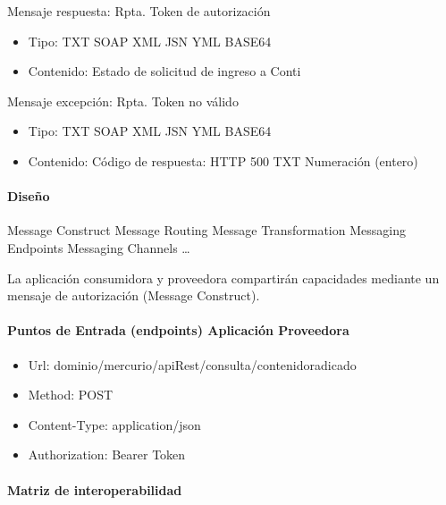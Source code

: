 \documentclass[
  paper=a4,
  ,captions=tableheading
]{scrartcl}
\providecommand{\tightlist}{%
  \setlength{\itemsep}{0pt}\setlength{\parskip}{0pt}}
\begin{document}
Mensaje respuesta: Rpta. Token de autorización

\begin{itemize}
\tightlist
\item
  Tipo: TXT \textbar{} SOAP \textbar{} XML \textbar{} JSN \textbar{} YML
  \textbar{} BASE64
\item
  Contenido: Estado de solicitud de ingreso a Conti
\end{itemize}

Mensaje excepción: Rpta. Token no válido

\begin{itemize}
\tightlist
\item
  Tipo: TXT \textbar{} SOAP \textbar{} XML \textbar{} JSN \textbar{} YML
  \textbar{} BASE64
\item
  Contenido: Código de respuesta: HTTP 500 \textbar{} TXT \textbar{}
  Numeración (entero)
\end{itemize}

\paragraph{Diseño}\label{sec:diseuxf1o-1}

Message Construct \textbar{} Message Routing \textbar{} Message
Transformation \textbar{} Messaging Endpoints \textbar{} Messaging
Channels \textbar{} \ldots{}

La aplicación consumidora y proveedora compartirán capacidades mediante
un mensaje de autorización (Message Construct).

\paragraph{Puntos de Entrada (endpoints) Aplicación
Proveedora}\label{sec:puntos-de-entrada-endpoints-aplicaciuxf3n-proveedora-1}

\begin{itemize}
\tightlist
\item
  Url: dominio/mercurio/apiRest/consulta/contenidoradicado
\item
  Method: POST
\item
  Content-Type: application/json
\item
  Authorization: Bearer Token
\end{itemize}

\paragraph{Matriz de
interoperabilidad}\label{sec:matriz-de-interoperabilidad-1}
\end{document}
